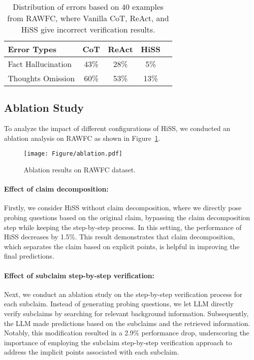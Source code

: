 \documentclass[11pt]{article}
\begin{document}
\begin{table}[t]
\centering
\begin{tabular}{lcccc}
\toprule
Error Types&CoT&ReAct&HiSS\\
\midrule
Fact Hallucination&43\%&28\%&5\%\\
Thoughts Omission&60\%&53\%&13\%\\
\bottomrule
\end{tabular}

\caption{Distribution of errors based on 40 examples from RAWFC, where Vanilla CoT, ReAct, and HiSS give incorrect verification results.}
\label{tbl:error}
\end{table}


\subsection{Ablation Study}
\label{sec:ana}

To analyze the impact of different configurations of HiSS, we conducted an ablation analysis on RAWFC as shown in Figure~\ref{fig:ablation}. 

\begin{figure}[t!]
  \centering
  \texttt{[image: Figure/ablation.pdf]}
  \caption{Ablation results on RAWFC dataset.}
  \label{fig:ablation}
  
\end{figure}


\paragraph{Effect of claim decomposition:}
Firstly, we consider HiSS without claim decomposition, where we directly pose probing questions based on the original claim, bypassing the claim decomposition step while keeping the step-by-step process. In this setting, the performance of HiSS decreases by 1.5\%. This result demonstrates that claim decomposition, which separates the claim based on explicit points, is helpful in improving the final predictions.


\paragraph{Effect of subclaim step-by-step verification:}
Next, we conduct an ablation study on the step-by-step verification process for each subclaim. Instead of generating probing questions, we let LLM directly verify subclaims by searching for relevant background information. Subsequently, the LLM made predictions based on the subclaims and the retrieved information. Notably, this modification resulted in a 2.9\% performance drop, underscoring the importance of employing the subclaim step-by-step verification approach to address the implicit points associated with each subclaim.
\end{document}
